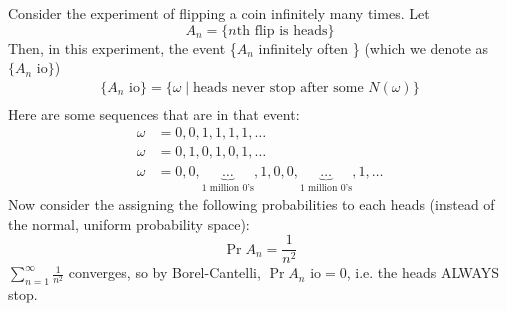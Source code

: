 \begin{example} 
    Consider the experiment of flipping a coin infinitely many times. Let
    \[ A_n = \{ \text{$n$th flip is heads} \} \]
    Then, in this experiment, the event \{$A_n$ infinitely often \} (which we denote as
    $\{A_n \text{ io}\}$)
    \begin{align*}
        \{A_n \text{ io} \} = \{ \omega \mid \text{heads never stop after some $N(\omega)$} \} \\
    \end{align*}
    Here are some sequences that are in that event:
    \begin{align*}
        \omega &= 0, 0, 1, 1, 1, 1, \dots \\
        \omega &= 0, 1, 0, 1, 0, 1, \dots \\
        \omega &= 0, 0, \underbrace{\dots}_{\text{1 million 0's}}, 1, 0, 0, \underbrace{\dots}_{\text{1 million 0's}}, 1, \dots
    \end{align*}
    Now consider the assigning the following probabilities to each heads (instead of the normal, uniform probability space):
    \[ \Pr{A_n} = \frac{1}{n^2} \]
    \(\sum_{n = 1}^{\infty} \frac{1}{n^2}\) converges, so by Borel-Cantelli, $\Pr{A_n \text{ io}} = 0$, i.e.
    the heads ALWAYS stop.
\end{example}